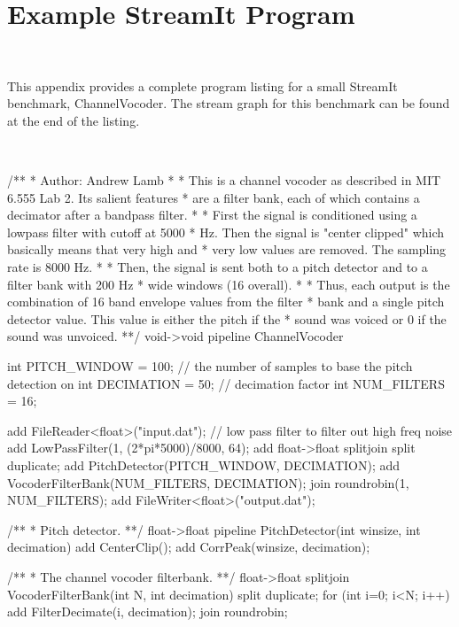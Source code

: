 \chapter{Example StreamIt Program}
\label{chap:example-program}

~ \\ \vspace{-0.7in}

\noindent This appendix provides a complete program listing for a small StreamIt
benchmark, ChannelVocoder.  The stream graph for this benchmark can be found at 
the end of the listing.

~ \\ \vspace{-0.8in}

/** 
 * Author:  Andrew Lamb
 *
 * This is a channel vocoder as described in MIT 6.555 Lab 2.  Its salient features
 * are a filter bank, each of which contains a decimator after a bandpass filter.
 * 
 * First the signal is conditioned using a lowpass filter with cutoff at 5000
 * Hz. Then the signal is "center clipped" which basically means that very high and
 * very low values are removed.  The sampling rate is 8000 Hz.
 *
 * Then, the signal is sent both to a pitch detector and to a filter bank with 200 Hz
 * wide windows (16 overall).
 * 
 * Thus, each output is the combination of 16 band envelope values from the filter
 * bank and a single pitch detector value. This value is either the pitch if the
 * sound was voiced or 0 if the sound was unvoiced.
 **/
void->void pipeline ChannelVocoder {
    int PITCH_WINDOW = 100; // the number of samples to base the pitch detection on
    int DECIMATION   = 50;  // decimation factor
    int NUM_FILTERS  = 16; 
    
    add FileReader<float>("input.dat");
    // low pass filter to filter out high freq noise
    add LowPassFilter(1, (2*pi*5000)/8000, 64); 
    add float->float splitjoin {
        split duplicate;
        add PitchDetector(PITCH_WINDOW, DECIMATION);
        add VocoderFilterBank(NUM_FILTERS, DECIMATION);
        join roundrobin(1, NUM_FILTERS);
    }
    add FileWriter<float>("output.dat");
}
/** 
 * Pitch detector.
 **/
float->float pipeline PitchDetector(int winsize, int decimation) {
    add CenterClip();
    add CorrPeak(winsize, decimation);
}

/**
 * The channel vocoder filterbank. 
 **/
float->float splitjoin VocoderFilterBank(int N, int decimation) {
    split duplicate;
    for (int i=0; i<N; i++) {
        add FilterDecimate(i, decimation);
    }
    join roundrobin;
}

